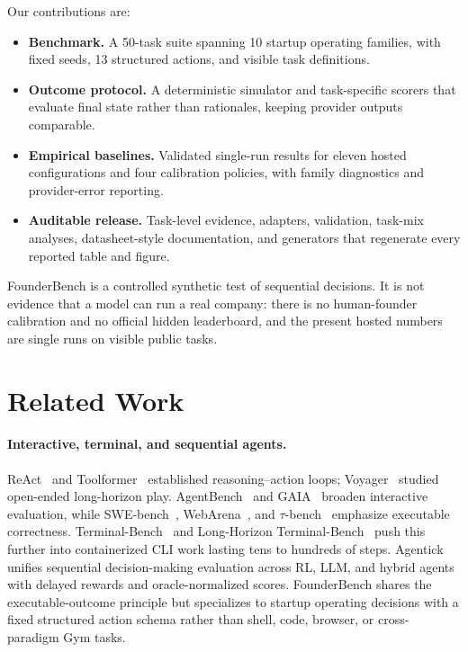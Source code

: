 \documentclass[sigconf,review]{acmart}
\begin{document}
Our contributions are:
\begin{itemize}
  \item \textbf{Benchmark.} A 50-task suite spanning 10 startup operating families, with fixed seeds, 13 structured actions, and visible task definitions.
  \item \textbf{Outcome protocol.} A deterministic simulator and task-specific scorers that evaluate final state rather than rationales, keeping provider outputs comparable.
  \item \textbf{Empirical baselines.} Validated single-run results for eleven hosted configurations and four calibration policies, with family diagnostics and provider-error reporting.
  \item \textbf{Auditable release.} Task-level evidence, adapters, validation, task-mix analyses, datasheet-style documentation, and generators that regenerate every reported table and figure.
\end{itemize}

FounderBench is a controlled synthetic test of sequential decisions.
It is not evidence that a model can run a real company: there is no human-founder calibration and no official hidden leaderboard, and the present hosted numbers are single runs on visible public tasks.

\section{Related Work}
\paragraph{Interactive, terminal, and sequential agents.}
ReAct~\cite{yao2023react} and Toolformer~\cite{schick2023toolformer} established reasoning--action loops; Voyager~\cite{wang2023voyager} studied open-ended long-horizon play.
AgentBench~\cite{liu2025agentbench} and GAIA~\cite{mialon2023gaia} broaden interactive evaluation, while SWE-bench~\cite{jimenez2024swebench}, WebArena~\cite{zhou2024webarena}, and $\tau$-bench~\cite{yao2024taubench} emphasize executable correctness.
Terminal-Bench~\cite{merrill2026terminalbench} and Long-Horizon Terminal-Bench~\cite{li2026lhtb} push this further into containerized CLI work lasting tens to hundreds of steps.
Agentick~\cite{creus2026agentick} unifies sequential decision-making evaluation across RL, LLM, and hybrid agents with delayed rewards and oracle-normalized scores.
FounderBench shares the executable-outcome principle but specializes to startup operating decisions with a fixed structured action schema rather than shell, code, browser, or cross-paradigm Gym tasks.
\end{document}
